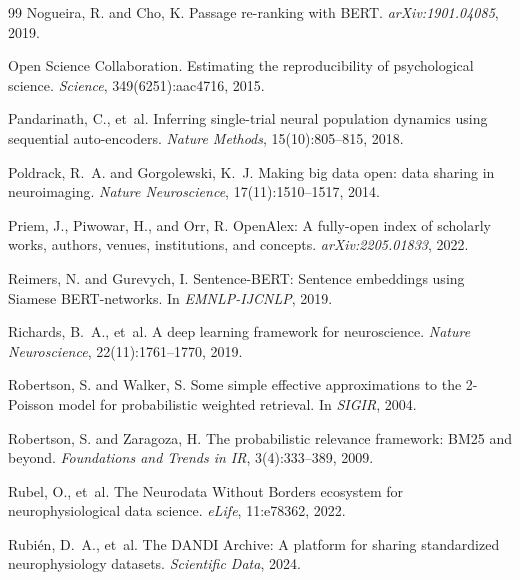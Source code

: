 \documentclass{article}
\theoremstyle{definition}
\begin{document}
\begin{thebibliography}{99}
Nogueira, R. and Cho, K.
\newblock Passage re-ranking with BERT.
\newblock \emph{arXiv:1901.04085}, 2019.

Open Science Collaboration.
\newblock Estimating the reproducibility of psychological science.
\newblock \emph{Science}, 349(6251):aac4716, 2015.

Pandarinath, C., et~al.
\newblock Inferring single-trial neural population dynamics using sequential auto-encoders.
\newblock \emph{Nature Methods}, 15(10):805--815, 2018.

Poldrack, R.~A. and Gorgolewski, K.~J.
\newblock Making big data open: data sharing in neuroimaging.
\newblock \emph{Nature Neuroscience}, 17(11):1510--1517, 2014.

Priem, J., Piwowar, H., and Orr, R.
\newblock OpenAlex: A fully-open index of scholarly works, authors, venues, institutions, and concepts.
\newblock \emph{arXiv:2205.01833}, 2022.

Reimers, N. and Gurevych, I.
\newblock Sentence-BERT: Sentence embeddings using Siamese BERT-networks.
\newblock In \emph{EMNLP-IJCNLP}, 2019.

Richards, B.~A., et~al.
\newblock A deep learning framework for neuroscience.
\newblock \emph{Nature Neuroscience}, 22(11):1761--1770, 2019.

Robertson, S. and Walker, S.
\newblock Some simple effective approximations to the 2-Poisson model for probabilistic weighted retrieval.
\newblock In \emph{SIGIR}, 2004.

Robertson, S. and Zaragoza, H.
\newblock The probabilistic relevance framework: BM25 and beyond.
\newblock \emph{Foundations and Trends in IR}, 3(4):333--389, 2009.

Rubel, O., et~al.
\newblock The Neurodata Without Borders ecosystem for neurophysiological data science.
\newblock \emph{eLife}, 11:e78362, 2022.

Rubi{\'e}n, D.~A., et~al.
\newblock The DANDI Archive: A platform for sharing standardized neurophysiology datasets.
\newblock \emph{Scientific Data}, 2024.


\end{thebibliography}
\end{document}
